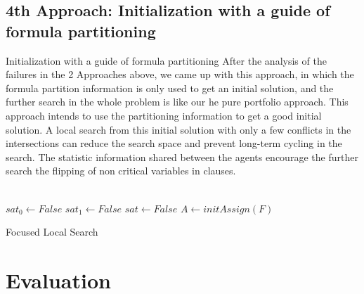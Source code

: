 \documentclass[12pt,a4paper,twoside]{scrartcl}
\numberwithin{equation}{section}
\begin{document}
\subsection{4th Approach: Initialization with a guide of formula partitioning}
Initialization with a guide of formula partitioning
After the analysis of the failures in the 2 Approaches above, we came up with this approach, in which the formula partition information is only used to get an initial solution, and the further search in the whole problem is like our he pure portfolio approach. This approach intends to use the partitioning information to get a good initial solution.  A local search from this initial solution with only a few conflicts in the intersections can reduce the search space and prevent long-term cycling in the search. The statistic information shared between the agents encourage the further search the flipping of non critical variables in clauses. \\
\\
\begin{algorithm}[H]
  $sat_0 \leftarrow False$\;
  $sat_1 \leftarrow False$\;
  $sat \leftarrow False$\;
  $A \leftarrow initAssign(F)$\;
 \caption{Focused Local Search}
\end{algorithm}  




\clearpage
\section{Evaluation} 
\label{sec:eva}
\end{document}
